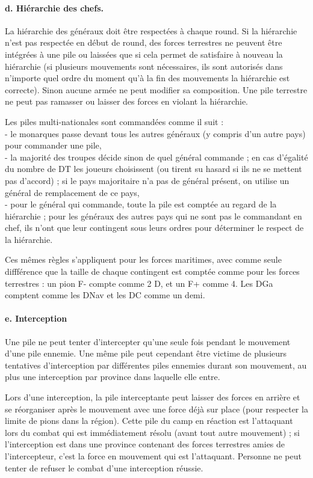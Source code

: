 \paragraph{d. Hiérarchie des chefs.}
La hiérarchie des généraux doit être respectées à chaque round. 
Si la hiérarchie n'est pas respectée en début de round, des forces
terrestres ne peuvent être intégrées à une pile ou laissées que si cela
permet de satisfaire à nouveau la hiérarchie (si plusieurs
mouvements sont nécessaires, ils sont autorisés dans n'importe
quel ordre du moment qu'à la fin des mouvements la hiérarchie est
correcte). Sinon aucune armée ne peut modifier sa composition.
Une pile terrestre ne peut pas ramasser ou laisser des forces en
violant la hiérarchie.

Les piles multi-nationales sont commandées comme il suit : \\
- le monarques passe devant tous les autres généraux (y compris
d'un autre pays) pour commander une pile, \\
- la majorité des troupes décide sinon de quel général commande ;
en cas d'égalité du nombre de DT les joueurs choisissent (ou tirent su hasard
si ils ne se mettent pas d'accord) ; si le pays majoritaire n'a pas de général présent,
on utilise un général de remplacement de ce pays,  \\
- pour le général qui commande, toute la pile est comptée au regard
de la hiérarchie ; pour les généraux des autres pays qui ne
sont pas le commandant en chef, ils n'ont que leur contingent
sous leurs ordres pour déterminer le respect de la hiérarchie.

Ces mêmes règles s'appliquent pour les forces maritimes, avec
comme seule diffférence que la taille de chaque contingent est
comptée comme pour les forces terrestres : un pion F- compte comme
2 D, et un F+ comme 4. Les DGa comptent comme les DNav et les
DC comme un demi.

\paragraph{e. Interception}
Une pile ne peut tenter d'intercepter qu'une seule fois pendant
le mouvement d'une pile ennemie. Une même pile peut
cependant être victime de plusieurs tentatives d'interception
par différentes piles ennemies durant son mouvement, au
plus une interception par province dans laquelle elle entre.

Lors d'une interception, la pile interceptante peut laisser des
forces en arrière et se réorganiser après le mouvement avec une
force déjà sur place (pour respecter la limite de pions
dans la région). Cette pile du camp en réaction est l'attaquant
lors du combat qui est immédiatement résolu (avant tout autre 
mouvement) ; si l'interception est  dans une province contenant des forces terrestres
amies de l'intercepteur, c'est la force en mouvement qui est l'attaquant.
Personne ne peut tenter de refuser le combat 
d'une interception réussie. 

